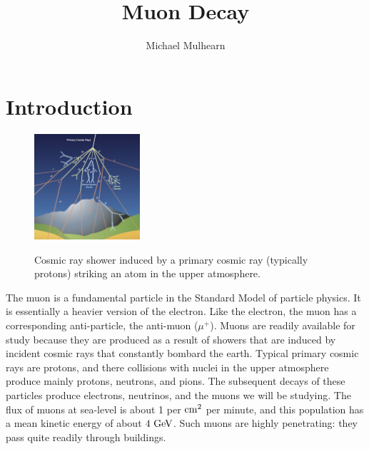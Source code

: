 \documentclass[12pt]{article}
\begin{document}

\title{Muon Decay}
\author{Michael Mulhearn}

\maketitle

\section{Introduction}

\begin{figure}[htbp]
\begin{center}
{\includegraphics[width=0.35\textwidth]{figs/cosmic_ray.jpg}}\\
\end{center}
\caption{\label{fig:cosmic}  Cosmic ray shower induced by a primary cosmic ray (typically protons) striking an atom in the upper atmosphere.}\end{figure}

The muon is a fundamental particle in the Standard Model of particle physics.  It is essentially a heavier version of the electron.  Like the electron, the muon has a corresponding anti-particle, the anti-muon ($\mu^+$).  Muons are readily available for study because they are produced as a result of showers that are induced by incident cosmic rays that constantly bombard the earth.  Typical primary cosmic rays are protons, and there collisions with nuclei in the upper atmosphere produce mainly protons, neutrons, and pions.  The subsequent decays of these particles produce electrons, neutrinos, and the muons we will be studying.  The flux of muons at sea-level is about 1 per ${\rm cm}^2$ per minute, and this population has a mean kinetic energy of about $4~\rm GeV$.  Such muons are highly penetrating:  they pass quite readily through buildings.
\end{document}
